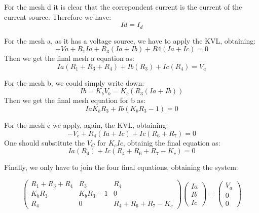 For the mesh d it is clear that the correpondent current is the current of the current source. Therefore we have:
\begin{equation}
  Id=I_d
  \label{meshdfinal}
\end{equation}


For the mesh a, as it has a voltage source, we have to apply the KVL, obtaining:
\begin{equation}
  -Va+R_1Ia+R_3(Ia+Ib)+R4(Ia+Ic)=0
  \label{meshaKVL}
\end{equation}
Then we get the final mesh a equation as:
\begin{equation}
  Ia(R_1+R_3+R_4)+Ib(R_3)+Ic(R_4)=V_a
  \label{meshaKVLfinal}
\end{equation}



For the mesh b, we could simply write down:
\begin{equation}
  Ib=K_bV_b=K_b(R_3(Ia+Ib))
  \label{meshbKVL}
\end{equation}
Then we get the final mesh equation for b as:
\begin{equation}
  IaK_bR_3+Ib(K_bR_3-1)=0
  \label{meshbKVLfinal}
\end{equation}


For the mesh c we apply, again, the KVL, obtaining:
\begin{equation}
  -V_c+R_4(Ia+Ic)+Ic(R_6+R_7)=0
  \label{meshcKVL}
\end{equation}
One should substitute the $V_C$ for $K_cIc$, obtainig the final equation as:
\begin{equation}
  Ia(R_4)+Ic(R_4+R_6+R_7-K_c)=0
  \label{meshcKVL}
\end{equation}


Finally, we only have to join the four final equations, obtaining the system:
\par
\begin{equation}
\begin{pmatrix}
  R_1+R_3+R_4 & R_3 & R_4 \\
  K_bR_3 & K_bR_3-1 & 0 \\
  R_4 & 0 & R_4+R_6+R_7-K_c
\end{pmatrix}
\begin{pmatrix}
  Ia  \\
  Ib  \\
  Ic
\end{pmatrix}
=
\begin{pmatrix}
  V_a  \\
  0  \\
  0
\end{pmatrix}
  \end{equation}

